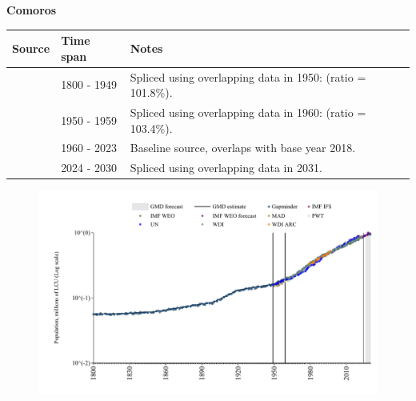 \documentclass[12pt,a4paper,landscape]{article}
\begin{document}
\begin{adjustbox}{max totalsize={\paperwidth}{\paperheight},center}
\begin{minipage}[t][\textheight][t]{\textwidth}
\vspace*{0.5cm}
{}
\begin{center}
{\Large\bfseries Comoros}
\end{center}
\vspace{0.5cm}
\begin{table}[H]
\centering
\small
\begin{tabular}{|l|l|l|}
\hline
\textbf{Source} & \textbf{Time span} & \textbf{Notes} \\
\hline
\rowcolor{white}\cite{Gapminder}& 1800 - 1949 &Spliced using overlapping data in 1950: (ratio = 101.8\%).\\
\rowcolor{lightgray}\cite{IMF_IFS}& 1950 - 1959 &Spliced using overlapping data in 1960: (ratio = 103.4\%).\\
\rowcolor{white}\cite{WDI}& 1960 - 2023 &Baseline source, overlaps with base year 2018.\\
\rowcolor{lightgray}\cite{Gapminder}& 2024 - 2030 &Spliced using overlapping data in 2031.\\
\hline
\end{tabular}
\end{table}
\begin{figure}[H]
\centering
\includegraphics[width=\textwidth,height=0.6\textheight,keepaspectratio]{graphs/COM_pop.pdf}
\end{figure}
\end{minipage}
\end{adjustbox}
\end{document}
